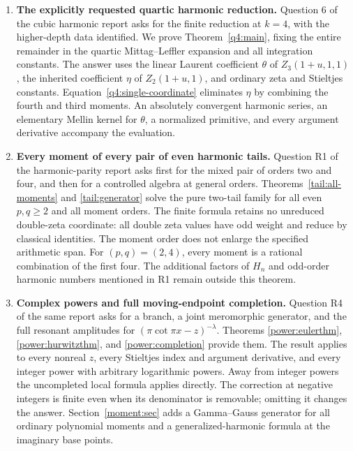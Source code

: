 \begin{enumerate}
\item \textbf{The explicitly requested quartic harmonic reduction.}
Question 6 of the cubic harmonic report asks for the finite reduction
at $k=4$, with the higher-depth data identified. We prove
Theorem~\ref{q4:main}, fixing the entire remainder in the quartic
Mittag--Leffler expansion and all integration constants. The answer
uses the linear Laurent coefficient $\theta$ of $Z_3(1+u,1,1)$,
the inherited coefficient $\eta$ of $Z_2(1+u,1)$, and ordinary
zeta and Stieltjes constants. Equation~\eqref{q4:single-coordinate}
eliminates $\eta$ by combining the fourth and third moments.
An absolutely convergent harmonic series, an elementary Mellin
kernel for $\theta$, a normalized primitive, and every argument
derivative accompany the evaluation.

\item \textbf{Every moment of every pair of even harmonic tails.}
Question R1 of the harmonic-parity report asks first for the mixed
pair of orders two and four, and then for a controlled algebra at
general orders. Theorems~\ref{tail:all-moments} and
\ref{tail:generator} solve the pure two-tail family for all even
$p,q\ge2$ and all moment orders. The finite formula retains no
unreduced double-zeta coordinate: all double zeta values have odd
weight and reduce by classical identities. The moment order does
not enlarge the specified arithmetic span. For $(p,q)=(2,4)$,
every moment is a rational combination of the first four. The
additional factors of $H_n$ and odd-order harmonic numbers mentioned
in R1 remain outside this theorem.

\item \textbf{Complex powers and full moving-endpoint completion.}
Question R4 of the same report asks for a branch, a joint
meromorphic generator, and the full resonant amplitudes for
$(\pi\cot\pi x-z)^{-\lambda}$. Theorems
\ref{power:eulerthm}, \ref{power:hurwitzthm}, and
\ref{power:completion} provide them. The result applies to every
nonreal $z$, every Stieltjes index and argument derivative, and
every integer power with arbitrary logarithmic powers. Away from
integer powers the uncompleted local formula applies directly.
The correction at negative integers is finite even when its
denominator is removable; omitting it changes the answer.
Section~\ref{moment:sec} adds a Gamma--Gauss generator for all
ordinary polynomial moments and a generalized-harmonic formula
at the imaginary base points.
\end{enumerate}

